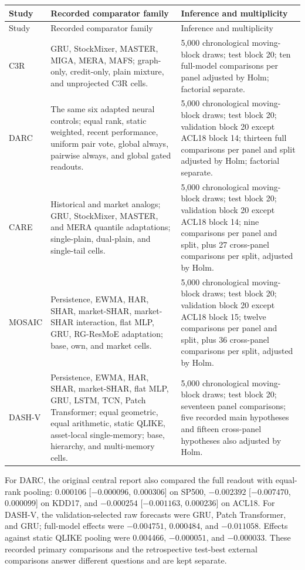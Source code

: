 \documentclass[10pt]{article}
\begin{document}
\begin{longtable}{p{1.5cm}p{8.5cm}p{4.6cm}}
\toprule
Study & Recorded comparator family & Inference and multiplicity \\
\midrule\endfirsthead
\toprule Study & Recorded comparator family & Inference and multiplicity \\ \midrule\endhead
C3R & GRU, StockMixer, MASTER, MIGA, MERA, MAFS; graph-only, credit-only, plain mixture, and unprojected C3R cells. & 5,000 chronological moving-block draws; test block 20; ten full-model comparisons per panel adjusted by Holm; factorial separate. \\
DARC & The same six adapted neural controls; equal rank, static weighted, recent performance, uniform pair vote, global always, pairwise always, and global gated readouts. & 5,000 chronological moving-block draws; test block 20; validation block 20 except ACL18 block 14; thirteen full comparisons per panel and split adjusted by Holm; factorial separate. \\
CARE & Historical and market analogs; GRU, StockMixer, MASTER, and MERA quantile adaptations; single-plain, dual-plain, and single-tail cells. & 5,000 chronological moving-block draws; test block 20; validation block 20 except ACL18 block 14; nine comparisons per panel and split, plus 27 cross-panel comparisons per split, adjusted by Holm. \\
MOSAIC & Persistence, EWMA, HAR, SHAR, market-SHAR, market-SHAR interaction, flat MLP, GRU, RG-ResMoE adaptation; base, own, and market cells. & 5,000 chronological moving-block draws; test block 20; validation block 20 except ACL18 block 15; twelve comparisons per panel and split, plus 36 cross-panel comparisons per split, adjusted by Holm. \\
DASH-V & Persistence, EWMA, HAR, SHAR, market-SHAR, flat MLP, GRU, LSTM, TCN, Patch Transformer; equal geometric, equal arithmetic, static QLIKE, asset-local single-memory; base, hierarchy, and multi-memory cells. & 5,000 chronological moving-block draws; test block 20; seventeen panel comparisons; five recorded main hypotheses and fifteen cross-panel hypotheses also adjusted by Holm. \\
\bottomrule
\end{longtable}

For DARC, the original central report also compared the full readout with equal-rank pooling: 0.000106 [$-0.000096$, 0.000306] on SP500, $-0.002392$ [$-0.007470$, 0.000099] on KDD17, and $-0.000254$ [$-0.001163$, 0.000236] on ACL18. For DASH-V, the validation-selected raw forecasts were GRU, Patch Transformer, and GRU; full-model effects were $-0.004751$, 0.000484, and $-0.011058$. Effects against static QLIKE pooling were 0.004466, $-0.000051$, and $-0.000033$. These recorded primary comparisons and the retrospective test-best external comparisons answer different questions and are kept separate.
\end{document}
